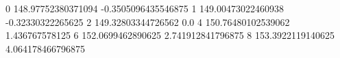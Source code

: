 0 148.97752380371094 -0.3505096435546875
1 149.00473022460938 -0.32330322265625
2 149.32803344726562 0.0
4 150.76480102539062 1.436767578125
6 152.0699462890625 2.741912841796875
8 153.3922119140625 4.064178466796875
